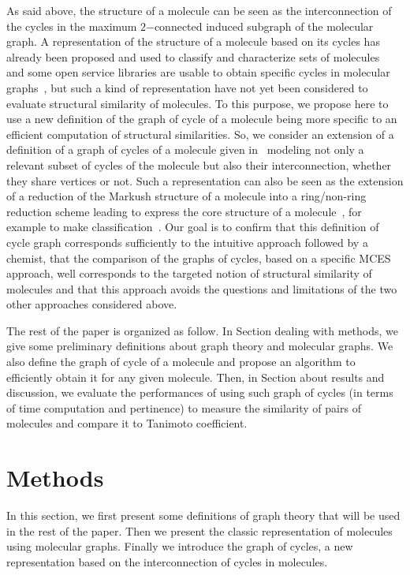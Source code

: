 \documentclass[10pt,letterpaper]{article}
\begin{document}
As said above, the structure of a molecule can be seen as the interconnection of the cycles in the maximum $2$−connected induced subgraph of the molecular graph. A representation of the structure of a molecule based on its cycles has already been proposed and used to classify and characterize sets of molecules~\cite{Gauzere2013,Horvarth2004} and some open service libraries are usable to obtain specific cycles in molecular graphs~\cite{Florian2017}, but such a kind of representation have not yet been considered to evaluate structural similarity of molecules. To this purpose, we propose here to use a new definition of the graph of cycle of a molecule being more specific to an efficient computation  of structural similarities.  So, we consider an extension of a definition of a graph of cycles of a molecule given in~\cite{Vismara2000} modeling not only a relevant subset of cycles of the molecule but also their interconnection, whether they share vertices or not. Such a representation can also be seen as the extension of a reduction of the Markush structure of a molecule into a ring/non-ring reduction scheme leading to express the core structure of a molecule~\cite{Lynch1996}, for example to make classification~\cite{Gillet1991}. Our goal is to confirm that this definition of cycle graph corresponds sufficiently to the intuitive approach followed by a chemist, that the comparison of the graphs of cycles, based on a specific MCES approach, well corresponds to the targeted notion of structural similarity of molecules and that this approach avoids the questions and limitations of the two other approaches considered above.

The rest of the paper is organized as follow. In Section dealing with methods, we give some preliminary definitions about graph theory and molecular graphs. We also define the graph of cycle of a molecule and propose an algorithm to efficiently obtain it for any given molecule. Then, in Section about results and discussion, we evaluate the performances of using such graph of cycles (in terms of time computation and pertinence) to measure the similarity of pairs of molecules and compare it to Tanimoto coefficient. 

\section*{Methods}

In this section, we first present some definitions of graph theory that will be used in the rest of the paper. Then we present the classic representation of molecules using molecular graphs. Finally we introduce the graph of cycles, a new representation based on the interconnection of cycles in molecules.
\end{document}
